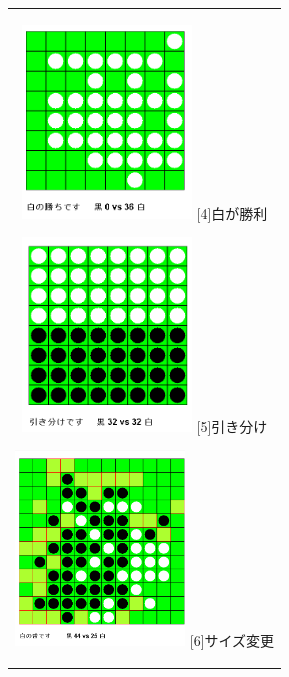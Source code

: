 \documentclass[10.5pt, a4paper]{jsarticle}
\begin{document}
\begin{figure}[htbp]
  \begin{center}
    \begin{tabular}{c}

      \begin{minipage}{0.33\hsize}
        \begin{center}
          \includegraphics[clip, width=4.5cm]{./image/img04.png}
          \hspace{1.6cm} [4]白が勝利
        \end{center}
      \end{minipage}

      \begin{minipage}{0.33\hsize}
        \begin{center}
          \includegraphics[clip, width=4.5cm]{./image/img05.png}
          \hspace{1.6cm} [5]引き分け
        \end{center}
      \end{minipage}

      \begin{minipage}{0.33\hsize}
        \begin{center}
          \includegraphics[clip, width=4.5cm]{./image/img06.png}
          \hspace{1.6cm} [6]サイズ変更
        \end{center}
      \end{minipage}

    \end{tabular}
  \end{center}
\end{figure}
\end{document}
